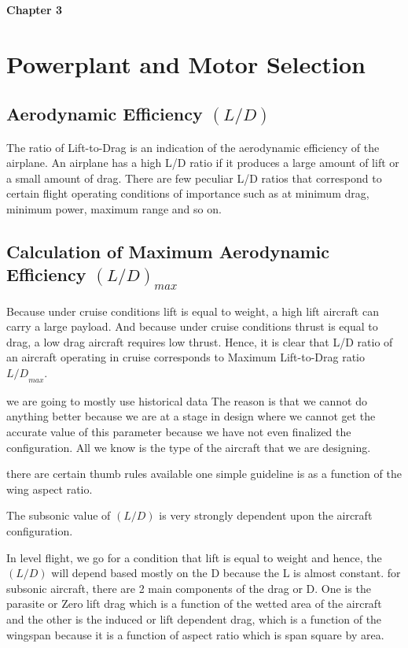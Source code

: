 \documentclass[12 pt]{article}
\begin{document}
\vfill

\afterpage{\clearpage}

\newpage

\textbf{\Huge{Chapter 3}}

\section{Powerplant and Motor Selection}

\subsection { Aerodynamic Efficiency ${(L/D)}$}
The ratio of Lift-to-Drag is an indication of the aerodynamic efficiency of the airplane. An airplane has a high L/D ratio if it produces a large amount of lift or a small amount of drag. There are few peculiar L/D ratios that correspond to certain flight operating conditions of importance such as at minimum drag, minimum power, maximum range and so on.

\subsection { Calculation of Maximum Aerodynamic Efficiency ${(L/D)}_{max}$}
Because under cruise conditions lift is equal to weight, a high lift aircraft can carry a large payload. And because under cruise conditions thrust is equal to drag, a low drag aircraft requires low thrust. Hence, it is clear that L/D ratio of an aircraft operating in cruise corresponds to Maximum Lift-to-Drag ratio ${L/D}_{max}$.

we are going to mostly use historical data The reason is that we cannot do anything better because we are at a stage in design where we cannot get the accurate value of this parameter because we have not even finalized the configuration. All we know is the type of the aircraft that we are designing.

there are certain thumb rules available one simple guideline is
as a function of the wing aspect ratio.

The subsonic value of ${(L/D)}$ is very strongly dependent upon the aircraft configuration.

In level flight, we go for a condition that lift is equal to weight and hence, the ${(L/D)}$ will depend based mostly on the D because the L is
almost constant.
for subsonic aircraft, there are 2 main components of the drag or D. One is the parasite or Zero lift drag which is a function of the wetted area of the aircraft and the other is the induced or lift dependent drag, which is a function of the wingspan because it is a function of
aspect ratio which is span square by area. 
\end{document}
